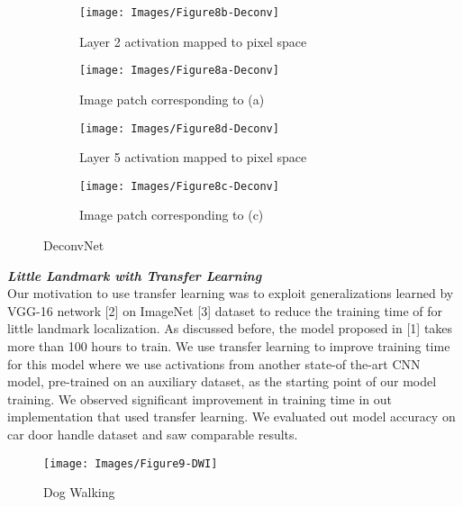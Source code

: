 \documentclass [11pt,letterpaper ,twoside ,openany ]{report}
\begin{document}
    \begin{figure}[h]
    \centering
        \begin{subfigure}[b]{0.22\linewidth}
            \centering
            \texttt{[image: Images/Figure8b-Deconv]}
            \caption{Layer 2 activation mapped to pixel space}
        \end{subfigure}    
        \begin{subfigure}[b]{0.22\linewidth}
            \centering
            \texttt{[image: Images/Figure8a-Deconv]}
            \caption{Image patch corresponding to (a)}
        \end{subfigure}
        \begin{subfigure}[b]{0.22\linewidth}
            \centering
            \texttt{[image: Images/Figure8d-Deconv]}
            \caption{Layer 5 activation mapped to pixel space}
        \end{subfigure}                
        \begin{subfigure}[b]{0.22\linewidth}
            \centering
            \texttt{[image: Images/Figure8c-Deconv]}
            \caption{Image patch corresponding to (c)}
        \end{subfigure}
        \caption{DeconvNet}
        \label{fig:devonv}
    \end{figure}

    \noindent
    \textbf{\textit{Little Landmark with Transfer Learning}}\\    
    Our motivation to use transfer learning was to exploit generalizations learned by VGG-16 network [2] on ImageNet [3] dataset to reduce the training time of for little landmark localization. As discussed before, the model proposed in [1] takes more than 100 hours to train. We use transfer learning to improve training time for this model where we use activations from another state-of the-art CNN model, pre-trained on an auxiliary dataset, as the starting point of our model training. We observed significant improvement in training time in out implementation that used transfer learning. We evaluated out model accuracy on car door handle dataset and saw comparable results.

    \begin{wrapfigure}{l}[9mm]{0.5\textwidth}
        \begin{center}
            \texttt{[image: Images/Figure9-DWI]}
        \end{center}
        \caption{Dog Walking}
    \end{wrapfigure}
\end{document}
